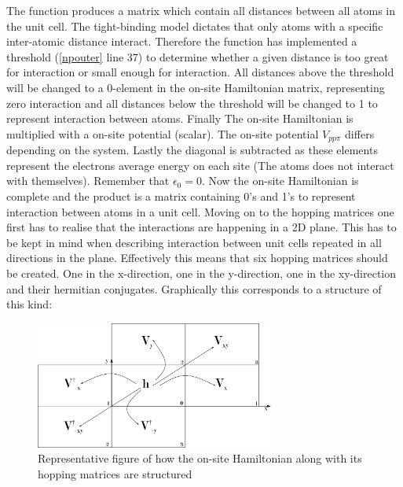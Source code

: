 The function produces a matrix which contain all distances between all atoms in the unit cell. The tight-binding model dictates that only atoms with a specific inter-atomic distance interact. Therefore the function has implemented a threshold (\cref{npouter} line 37) to determine whether a given distance is too great for interaction or small enough for interaction. All distances above the threshold will be changed to a 0-element in the on-site Hamiltonian matrix, representing zero interaction and all distances below the threshold will be changed to 1 to represent interaction between atoms. Finally The on-site Hamiltonian is multiplied with a on-site potential (scalar). The on-site potential \(V_{pp\pi}\) differs depending on the system. Lastly the diagonal is subtracted as these elements represent the electrons average energy on each site (The atoms does not interact with themselves). Remember that \(\epsilon_0 = 0\). Now the on-site Hamiltonian is complete and the product is a matrix containing 0's and 1's to represent interaction between atoms in a unit cell. \newline
Moving on to the hopping matrices one first has to realise that the interactions are happening in a 2D plane. This has to be kept in mind when describing interaction between unit cells repeated in all directions in the plane. Effectively this means that six hopping matrices should be created. One in the x-direction, one in the y-direction, one in the xy-direction and their hermitian conjugates. Graphically this corresponds to a structure of this kind:
\begin{figure}[H]
	\centering
	\includegraphics[width = 0.7\textwidth]{Figures/repfig.eps}
	\caption{Representative figure of how the on-site Hamiltonian along with its hopping matrices are structured}
	\label{repfig}
\end{figure}
